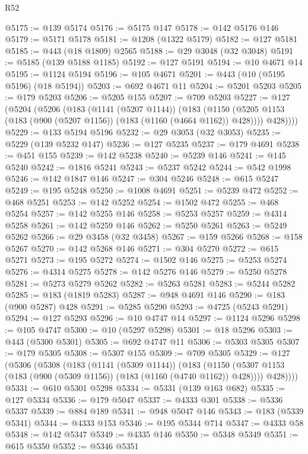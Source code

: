 \begin{lexlean}{R52}
\begin{coremodule}
{{{{{{{{{{{{{{{{{{{{{{{{{{{{{{{{{{{{{{{{{{{{{{{{{{{{{{{{{{{{{{{{{{{{{{{{{{{{{{{{{{{{{{{{{{{{{{{{{{{{{{{{{{{{{{{{{{{{{{{{{{{{{{{{{{{{{{{{{{{{{{{{{{{{{{{{{{{{{{{{{{{{{{{{{{{{{{{{{{{{{{{{{{{{{{{{{{{{{{@5175 := @139 @5174
@5176 := @5175 @147
@5178 := @142 @5176 @146
@5179 := @5171 @5178
@5181 := @1208 (@1322 @5179)
@5182 := @127 @5181
@5185 := @443 (@18 @1809) @2565
@5188 := @29 @3048 (@32 @3048)
@5191 := @5185 (@139 @5188 @1185)
@5192 := @127 @5191
@5194 := @10 @4671 @14
@5195 := @1124 @5194
@5196 := @105 @4671
@5201 := @443 (@10 (@5195 @5196) (@18 @5194))
@5203 := @692 @4671 @11
@5204 := @5201 @5203
@5205 := @179 @5203
@5206 := @5205 @155
@5207 := @709 @5203
@5227 := @127
    (@5204
      (@5206
        (@183
          (@1141 (@5207 @1144))
          (@183
            (@1150 (@5205 @1153 (@183 (@900 (@5207 @1156)) (@183 (@1160 (@4664 @1162)) @428))))
            @428))))
@5229 := @133 @5194 @5196
@5232 := @29 @3053 (@32 @3053)
@5235 := @5229 (@139 @5232 @147)
@5236 := @127 @5235
@5237 := @179 @4691
@5238 := @451 @155
@5239 := @142 @5238
@5240 := @5239 @146
@5241 := @145 @5240
@5242 := @1816 @5241
@5243 := @5237 @5242
@5244 := @542 @1998
@5246 := @142 @1847 @146
@5247 := @304 @5246
@5248 := @615 @5247
@5249 := @195 @5248
@5250 := @1008 @4691
@5251 := @5239 @472
@5252 := @468 @5251
@5253 := @142 @5252
@5254 := @1502 @472
@5255 := @468 @5254
@5257 := @142 @5255 @146
@5258 := @5253 @5257
@5259 := @4314 @5258
@5261 := @142 @5259 @146
@5262 := @5250 @5261
@5263 := @5249 @5262
@5266 := @29 @3458 (@32 @3458)
@5267 := @159 @5266
@5268 := @158 @5267
@5270 := @142 @5268 @146
@5271 := @304 @5270
@5272 := @615 @5271
@5273 := @195 @5272
@5274 := @1502 @146
@5275 := @5253 @5274
@5276 := @4314 @5275
@5278 := @142 @5276 @146
@5279 := @5250 @5278
@5281 := @5273 @5279 @5262
@5282 := @5263 @5281
@5283 := @5244 @5282
@5285 := @183 (@1819 @5283)
@5287 := @948 @4691 @146
@5290 := @183 (@900 @5287) @428
@5291 := @5285 @5290
@5293 := @4725 (@5243 @5291)
@5294 := @127 @5293
@5296 := @10 @4747 @14
@5297 := @1124 @5296
@5298 := @105 @4747
@5300 := @10 (@5297 @5298)
@5301 := @18 @5296
@5303 := @443 (@5300 @5301)
@5305 := @692 @4747 @11
@5306 := @5303 @5305
@5307 := @179 @5305
@5308 := @5307 @155
@5309 := @709 @5305
@5329 := @127
    (@5306
      (@5308
        (@183
          (@1141 (@5309 @1144))
          (@183
            (@1150 (@5307 @1153 (@183 (@900 (@5309 @1156)) (@183 (@1160 (@4740 @1162)) @428))))
            @428))))
@5331 := @610 @5301 @5298
@5334 := @5331 (@139 @163 @682)
@5335 := @127 @5334
@5336 := @179 @5047
@5337 := @4333 @301
@5338 := @5336 @5337
@5339 := @884 @189
@5341 := @948 @5047 @146
@5343 := @183 (@5339 @5341)
@5344 := @4333 @153
@5346 := @195 @5344 @714
@5347 := @4333 @58
@5348 := @142 @5347
@5349 := @4335 @146
@5350 := @5348 @5349
@5351 := @615 @5350
@5352 := @5346 @5351
}}}}}}}}}}}}}}}}}}}}}}}}}}}}}}}}}}}}}}}}}}}}}}}}}}}}}}}}}}}}}}}}}}}}}}}}}}}}}}}}}}}}}}}}}}}}}}}}}}}}}}}}}}}}}}}}}}}}}}}}}}}}}}}}}}}}}}}}}}}}}}}}}}}}}}}}}}}}}}}}}}}}}}}}}}}}}}}}}}}}}}}}}}}}}}}}}}}}}}
\end{coremodule}
\end{lexlean}
